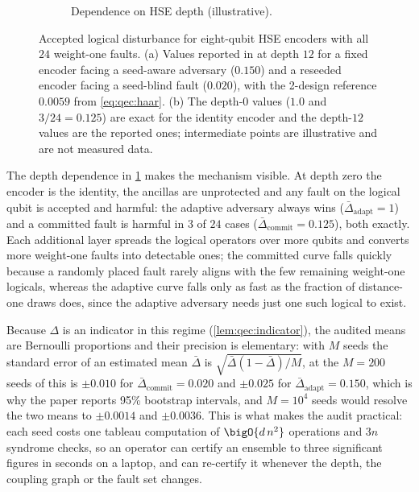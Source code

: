 \begin{figure}[htbp]
\begin{subfigure}[t]{0.48\textwidth}
\caption{Dependence on HSE depth (illustrative).}
\label{fig:qec:disturbance-depth}
\end{subfigure}
\caption{Accepted logical disturbance for eight-qubit HSE encoders with all $24$ weight-one faults. (a) Values reported in \cite{guo2026qecaudit} at depth $12$ for a fixed encoder facing a seed-aware adversary ($0.150$) and a reseeded encoder facing a seed-blind fault ($0.020$), with the 2-design reference $0.0059$ from \cref{eq:qec:haar}. (b) The depth-$0$ values ($1.0$ and $3/24=0.125$) are exact for the identity encoder and the depth-$12$ values are the reported ones; intermediate points are illustrative and are not measured data.}
\label{fig:qec:disturbance}
\end{figure}

The depth dependence in \cref{fig:qec:disturbance-depth} makes the mechanism visible. At depth zero the encoder is the identity, the ancillas are unprotected and any fault on the logical qubit is accepted and harmful: the adaptive adversary always wins ($\bar\Delta_{\mathrm{adapt}}=1$) and a committed fault is harmful in $3$ of $24$ cases ($\bar\Delta_{\mathrm{commit}}=0.125$), both exactly. Each additional layer spreads the logical operators over more qubits and converts more weight-one faults into detectable ones; the committed curve falls quickly because a randomly placed fault rarely aligns with the few remaining weight-one logicals, whereas the adaptive curve falls only as fast as the fraction of distance-one draws does, since the adaptive adversary needs just one such logical to exist.

Because $\Delta$ is an indicator in this regime (\cref{lem:qec:indicator}), the audited means are Bernoulli proportions and their precision is elementary: with $M$ seeds the standard error of an estimated mean $\bar\Delta$ is $\sqrt{\bar\Delta(1-\bar\Delta)/M}$, at the $M=200$ seeds of \cite{guo2026qecaudit} this is $\pm0.010$ for $\bar\Delta_{\mathrm{commit}}=0.020$ and $\pm0.025$ for $\bar\Delta_{\mathrm{adapt}}=0.150$, which is why the paper reports 95\% bootstrap intervals, and $M=10^{4}$ seeds would resolve the two means to $\pm0.0014$ and $\pm0.0036$. This is what makes the audit practical: each seed costs one tableau computation of $\bigO{d\,n^{2}}$ operations and $3n$ syndrome checks, so an operator can certify an ensemble to three significant figures in seconds on a laptop, and can re-certify it whenever the depth, the coupling graph or the fault set changes.

